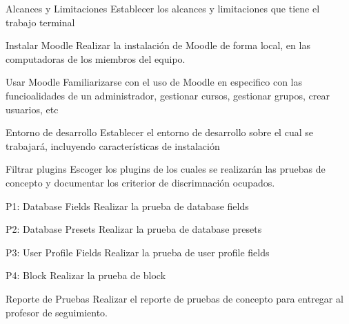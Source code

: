\vfill\null\columnbreak

\begin{Actividad}{Alcances y Limitaciones}{%
    Establecer los alcances y limitaciones que tiene el trabajo terminal}
    \PBitem {}%
\end{Actividad}

\begin{Actividad}{Instalar Moodle}{%
    Realizar la instalación de Moodle de forma local, en las computadoras de los miembros del equipo.}
    \PBitem {}%
\end{Actividad}

\begin{Actividad}{Usar Moodle}{%
    Familiarizarse con el uso de Moodle en especifico con las funcioalidades de un administrador, gestionar cursos, gestionar grupos, crear usuarios, etc}
    \PBitem {}%
\end{Actividad}


\begin{Actividad}{Entorno de desarrollo}{%
    Establecer el entorno de desarrollo sobre el cual se trabajará, incluyendo características de instalación}
    \PBitem {}%
\end{Actividad}

\begin{Actividad}{Filtrar plugins}{%
    Escoger los plugins de los cuales se realizarán las pruebas de concepto y documentar los criterior de discrimnación ocupados.}
    \PBitem {}%
\end{Actividad}

\begin{Actividad}{P1: Database Fields}{%
    Realizar la prueba de database fields}
    \PBitem {}%
\end{Actividad}

\begin{Actividad}{P2: Database Presets}{%
    Realizar la prueba de database presets}
    \PBitem {}%
\end{Actividad}

\begin{Actividad}{P3: User Profile Fields}{%
    Realizar la prueba de user profile fields}
    \PBitem {}%
\end{Actividad}

\begin{Actividad}{P4: Block}{%
    Realizar la prueba de block}
    \PBitem {}%
\end{Actividad}

\begin{Actividad}{Reporte de Pruebas}{%
    Realizar el reporte de pruebas de concepto para entregar al profesor de seguimiento. }
    \PBitem {}%
\end{Actividad}
